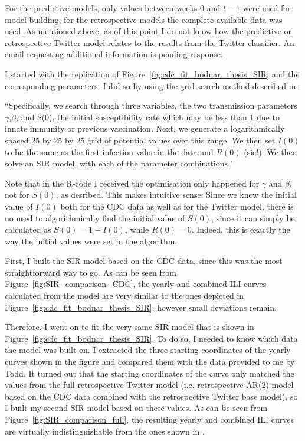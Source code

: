 \documentclass[11pt, a4paper,twoside]{report}\usepackage[]{graphicx}\usepackage[]{color}
\begin{document}
For the predictive models, only values between weeks $0$ and $t-1$ were used for model building, for the retrospective models the complete available data was used. As mentioned above, as of this point I do not know how the predictive or retrospective Twitter model relates to the results from the Twitter classifier. An email requesting additional information is pending response.

I started with the replication of Figure~\ref{fig:cdc_fit_bodnar_thesis_SIR} and the corresponding parameters. I did so by using the grid-search method described in \cite{bodnar_data_2015}: 

``Specifically, we
search through three variables, the two transmission parameters $\gamma$,$\beta$, and S(0), the initial susceptibility rate which may be less than 1 due to innate immunity or previous vaccination. Next, we generate a logarithmically spaced 25 by 25 by 25 grid of potential values over this range. We then set $I(0)$ to be the same as the first infection value in the data and $R(0)$ (sic!). We then solve an SIR model, with each of the parameter combinations." 

Note that in the R-code I received the optimisation only happened for $\gamma$ and $\beta$, not for $S(0)$, as desribed. This makes intuitive sense: Since we know the initial value of $I(0)$ both for the CDC data as well as for the Twitter model, there is no need to algorithmically find the initial value of $S(0)$, since it can simply be calculated as $S(0)=1-I(0)$, while $R(0)=0$. Indeed, this is exactly the way the initial values were set in the algorithm.

First, I built the SIR model based on the CDC data, since this was the most straightforward way to go. As can be seen from Figure~\ref{fig:SIR_comparison_CDC}, the yearly and combined ILI curves calculated from the model are very similar to the ones depicted in Figure~\ref{fig:cdc_fit_bodnar_thesis_SIR}, however small deviations remain.

Therefore, I went on to fit the very same SIR model that is shown in Figure~\ref{fig:cdc_fit_bodnar_thesis_SIR}. To do so, I needed to know which data the model was built on. I extracted the three starting coordinates of the yearly curves shown in the figure and compared them with the data provided to me by Todd. It turned out that the starting coordinates of the curve only matched the values from the full retrospective Twitter model (i.e. retrospective AR(2) model based on the CDC data combined with the retrospective Twitter base model), so I built my second SIR model based on these values. As can be seen from Figure~\ref{fig:SIR_comparison_full}, the resulting yearly and combined ILI curves are virtually indistinguishable from the ones shown in \cite{bodnar_data_2015}.
\end{document}

